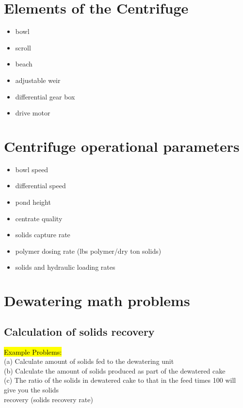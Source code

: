 \section{Elements of the Centrifuge}	


					\begin{itemize}
						\item bowl
						\item scroll
						\item beach
						\item adjustable weir
						\item differential gear box
						\item drive motor
					\end{itemize}

\section{Centrifuge operational parameters}	
					\begin{itemize}
						\item bowl speed
						\item differential speed
						\item pond height
						\item centrate quality
						\item solids capture rate
						\item polymer dosing rate (lbs polymer/dry ton solids)
						\item solids and hydraulic loading rates
					\end{itemize}

\section{Dewatering math problems}

\subsection{Calculation of solids recovery}



                \hl{Example Problems:}\\


(a) Calculate amount of solids fed to the dewatering unit\\
(b) Calculate the amount of solids produced as part of the dewatered cake\\
(c) The ratio of the solids in dewatered cake to that in the feed times 100 will give you the solids\\
recovery (solids recovery rate)\\


